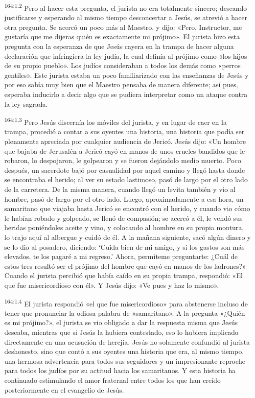 \par 
\textsuperscript{164:1.2} Pero al hacer esta pregunta, el jurista no era totalmente sincero; deseando justificarse y esperando al mismo tiempo desconcertar a Jesús, se atrevió a hacer otra pregunta. Se acercó un poco más al Maestro, y dijo: «Pero, Instructor, me gustaría que me dijeras quién es exactamente mi prójimo». El jurista hizo esta pregunta con la esperanza de que Jesús cayera en la trampa de hacer alguna declaración que infringiera la ley judía, la cual definía al prójimo como «los hijos de su propio pueblo». Los judíos consideraban a todos los demás como «perros gentiles». Este jurista estaba un poco familiarizado con las enseñanzas de Jesús y por eso sabía muy bien que el Maestro pensaba de manera diferente; así pues, esperaba inducirlo a decir algo que se pudiera interpretar como un ataque contra la ley sagrada.

\par 
\textsuperscript{164:1.3} Pero Jesús discernía los móviles del jurista, y en lugar de caer en la trampa, procedió a contar a sus oyentes una historia, una historia que podía ser plenamente apreciada por cualquier audiencia de Jericó. Jesús dijo: «Un hombre que bajaba de Jerusalén a Jericó cayó en manos de unos crueles bandidos que le robaron, lo despojaron, le golpearon y se fueron dejándolo medio muerto. Poco después, un sacerdote bajó por casualidad por aquel camino y llegó hasta donde se encontraba el herido; al ver su estado lastimoso, pasó de largo por el otro lado de la carretera. De la misma manera, cuando llegó un levita también y vio al hombre, pasó de largo por el otro lado. Luego, aproximadamente a esa hora, un samaritano que viajaba hasta Jericó se encontró con el herido, y cuando vio cómo le habían robado y golpeado, se llenó de compasión; se acercó a él, le vendó sus heridas poniéndoles aceite y vino, y colocando al hombre en su propia montura, lo trajo aquí al albergue y cuidó de él. A la mañana siguiente, sacó algún dinero y se lo dio al posadero, diciendo: `Cuida bien de mi amigo, y si los gastos son más elevados, te los pagaré a mi regreso.' Ahora, permíteme preguntarte: ¿Cuál de estos tres resultó ser el prójimo del hombre que cayó en manos de los ladrones?» Cuando el jurista percibió que había caído en su propia trampa, respondió: «El que fue misericordioso con él». Y Jesús dijo: «Ve pues y haz lo mismo».

\par 
\textsuperscript{164:1.4} El jurista respondió «el que fue misericordioso» para abstenerse incluso de tener que pronunciar la odiosa palabra de «samaritano». A la pregunta «¿Quién es mi prójimo?», el jurista se vio obligado a dar la respuesta misma que Jesús deseaba, mientras que si Jesús la hubiera contestado, eso lo hubiera implicado directamente en una acusación de herejía. Jesús no solamente confundió al jurista deshonesto, sino que contó a sus oyentes una historia que era, al mismo tiempo, una hermosa advertencia para todos sus seguidores y un impresionante reproche para todos los judíos por su actitud hacia los samaritanos. Y esta historia ha continuado estimulando el amor fraternal entre todos los que han creído posteriormente en el evangelio de Jesús.

